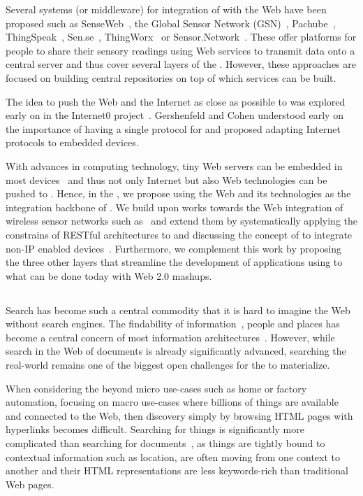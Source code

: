 Several systems (or middleware) for integration of \sts{} with the Web have been proposed such as SenseWeb~\cite{Grosky2007,Luo2008}, the Global Sensor Network (GSN)~\cite{Aberer2007}, Pachube~, ThingSpeak~, Sen.se~, ThingWorx~ or Sensor.Network~\cite{Gupta2010}. These offer platforms for people to share their sensory readings using Web services to transmit data onto a central server and thus cover several layers of the \WoTA{}. However, these approaches are focused on building central repositories on top of which services can be built. 

The idea to push the Web and the Internet as close as possible to \sts{} was explored early on in the Internet0 project~\cite{Gershenfeld2006}. Gershenfeld and Cohen understood early on the importance of having a single protocol for \sts{} and proposed adapting Internet protocols to embedded devices. 

With advances in computing technology, tiny Web servers can be embedded in most devices~\cite{Dunkels2003,Hui2008,Duquennoy2009a} and thus not only Internet but also Web technologies can be pushed to \sts{}. Hence, in the \devLayer{}, we propose using the Web and its technologies as the integration backbone of \sts{}. We build upon works towards the Web integration of wireless sensor networks such as~\cite{Luckenbach2005,Drytkiewicz2004-pREST,Dickerson2008} and extend them by systematically applying the constrains of RESTful architectures to \sts{} and discussing the concept of \sgs{} to integrate non-IP enabled devices~\cite{Guinard2011b}. Furthermore, we complement this work by proposing the three other layers that streamline the development of applications using \sts{} to what can be done today with Web 2.0 mashups. 

\subsection{\findLayer{}}
Search has become such a central commodity that it is hard to imagine the Web without search engines. The findability of information~\cite{Morville2005}, people and places has become a central concern of most information architectures~\cite{Morville2006}. However, while search in the Web of documents is already significantly advanced, searching the real-world remains one of the biggest open challenges for the \WoTLong{} to materialize. 

When considering the \WoTLong{} beyond micro use-cases such as home or factory automation, focusing on macro use-cases where billions of things are available and connected to the Web, then discovery simply by browsing HTML pages with hyperlinks becomes difficult. Searching for things is significantly more complicated than searching for documents~\cite{Romer2010}, as things are tightly bound to contextual information such as location, are often moving from one context to another and their HTML representations are less keywords-rich than traditional Web pages. 

